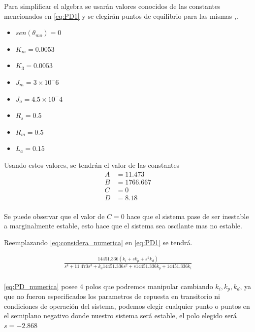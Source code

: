 \documentclass[a4paper]{IEEEtran} %
\begin{document}
Para simplificar el algebra se usarán valores conocidos de las constantes mencionados en \ref{eq:PD1} y se elegirán puntos de equilibrio para las mismas \cite{dcmotor},\cite{edxpage}.
\begin{itemize}
    \item $sen(\theta_{mo})=0$
    \item $K_{m}=0.0053$
    \item $K_{3}=0.0053$
    \item $J_{m}=3\times 10^-6$
    \item $J_{a}=4.5\times 10^-4$
    \item $R_{s}=0.5$
    \item $R_{m}=0.5$
    \item $L_{a}=0.15$
\end{itemize}

Usando estos valores, se tendrán el valor de las constantes
\begin{equation}
    \begin{split}
        A&=11.473\\
        B&=1766.667\\
        C&=0\\
        D&=8.18\\
    \end{split}
    \label{eq:considera_numerica}
\end{equation}

Se puede observar que el valor de $C=0$ hace que el sistema pase de ser inestable a marginalmente estable, esto hace que el sistema sea oscilante mas no estable.

Reemplazando \ref{eq:considera_numerica} en \ref{eq:PD1} se tendrá.

\begin{equation}
    \begin{split}
        \frac{14451.336(k_{i}+sk_{p}+s^2k_{d})}{s^4+11.473s^3+k_{d}14451.336s^2+s14451.336k_{p}+14451.336k_{i}}\\
    \end{split}
    \label{eq:PD_numerica}
\end{equation}

\ref{eq:PD_numerica} posee 4 polos que podremos manipular cambiando $k_{i},k_{p},k_{d}$, ya que no fueron especificados los parametros de repuesta en transitorio ni condiciones de operación del sistema, podemos elegir cualquier punto o puntos en el semiplano negativo donde nuestro sistema será estable, el polo elegido será $s=-2.868$ 
\end{document}
